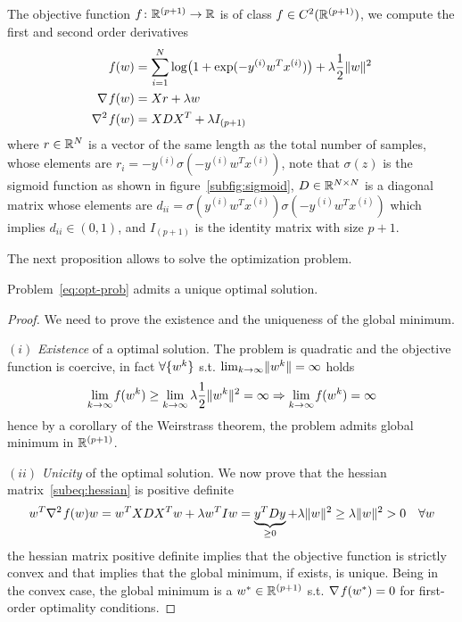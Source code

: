 The objective function $f\colon\mathbb{R}^{(p+1)}\to\mathbb{R}$ is of class $f\in C^2(\mathbb{R}^{(p+1)})$, we compute the first and second order derivatives
\begin{subequations}\label{eq:f-df-ddf}
\begin{align}
\operatorname*{\mathit{f}}(w) &= \sum_{i=1}^N\log\bigl(1+\exp(-y^{(i)}w^Tx^{(i)})\bigr)+\lambda\frac{1}{2}\lVert w\rVert^2 \label{subeq:obj-fun} \\
\nabla\operatorname*{\mathit{f}}(w) &= Xr+\lambda w \label{subeq:jacobian} \\
\nabla^2\operatorname*{\mathit{f}}(w) &= XDX^T+\lambda I_{(p+1)}\label{subeq:hessian}
\end{align}
\end{subequations}
where $r\in\mathbb{R}^N$ is a vector of the same length as the total number of samples, whose elements are $r_i=-y^{(i)}\sigma(-y^{(i)}w^Tx^{(i)})$, note that $\sigma(z)$ is the sigmoid function as shown in figure~\vref{subfig:sigmoid}, $D\in\mathbb{R}^{N\times N}$ is a diagonal matrix whose elements are $d_{ii}=\sigma(y^{(i)}w^Tx^{(i)})\sigma(-y^{(i)}w^Tx^{(i)})$ which implies $d_{ii}\in(0,1)$, and $I_{(p+1)}$ is the identity matrix with size $p+1$.

The next proposition allows to solve the optimization problem.

\begin{prop}
Problem~\eqref{eq:opt-prob} admits a unique optimal solution.
\end{prop}
\begin{proof}
We need to prove the existence and the uniqueness of the global minimum.

\noindent$(i)$ \emph{Existence} of a optimal solution. The problem is quadratic and the objective function is coercive, in fact $\forall\{w^k\}$ s.t. $\lim_{k\to\infty}\lVert w^k\rVert=\infty$ holds
\[
\lim_{k\to\infty}\operatorname*{\mathit{f}}(w^k)\geq\lim_{k\to\infty}\lambda\frac{1}{2}\lVert w^k\rVert^2=\infty\Rightarrow\lim_{k\to\infty}\operatorname*{\mathit{f}}(w^k)=\infty
\]
hence by a corollary of the Weirstrass theorem, the problem admits global minimum in $\mathbb{R}^{(p+1)}$.

\noindent$(ii)$ \emph{Unicity} of the optimal solution. We now prove that the hessian matrix~\eqref{subeq:hessian} is positive definite
\[
w^T\nabla^2\operatorname*{\mathit{f}}(w)w=w^TXDX^Tw+\lambda w^TIw=\underbrace{y^TDy}_{\geq0}+\lambda\lVert w\rVert^2\geq\lambda\lVert w\rVert^2>0\quad\forall w
\]
the hessian matrix positive definite implies that the objective function is strictly convex and that implies that the global minimum, if exists, is unique. Being in the convex case, the global minimum is a $w^\ast\in\mathbb{R}^{(p+1)}$ s.t. $\nabla\operatorname*{\mathit{f}}(w^\ast)=0$ for first-order optimality conditions.\qedhere
\end{proof}

